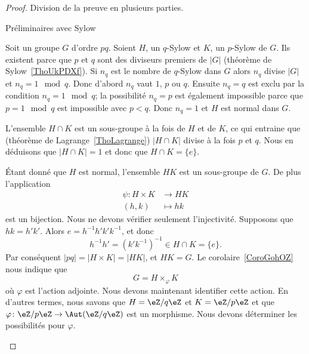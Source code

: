 \begin{proof}
    Division de la preuve en plusieurs parties.
    \begin{subproof}
    \item[Préliminaires avec Sylow]

        Soit un groupe \( G\) d'ordre \( pq\). Soient \( H\), un \( q\)-Sylow et \( K\), un \( p\)-Sylow de \( G\). Ils existent parce que \( p\) et \( q\) sont des diviseurs premiers de \( | G |\) (théorème de Sylow~\ref{ThoUkPDXf}). Si \( n_q\) est le nombre de \( q\)-Sylow dans \( G\) alors \( n_q\) divise \( | G |\) et \( n_q=1\mod q\). Donc d'abord \( n_q\) vaut \( 1\), \( p\) ou \( q\). Ensuite \( n_q=q\) est exclu par la condition \( n_q=1\mod q\); la possibilité \( n_q=p\) est également impossible parce que \( p=1\mod q\) est impossible avec \( p<q\). Donc \( n_q=1\) et \( H\) est normal dans \( G\).

        L'ensemble \( H\cap K\) est un sous-groupe à la fois de \( H\) et de \( K\), ce qui entraine que (théorème de Lagrange~\ref{ThoLagrange}) \( | H\cap K |\) divise à la fois \( p\) et \( q\). Nous en déduisons que \( | H\cap K |=1\) et donc que \( H\cap K=\{ e \}\).

        Étant donné que \( H\) est normal, l'ensemble \( HK\) est un sous-groupe de \( G\). De plus l'application
        \begin{equation}
            \begin{aligned}
                \psi\colon H\times K&\to HK \\
                (h,k)&\mapsto hk
            \end{aligned}
        \end{equation}
        est un bijection. Nous ne devons vérifier seulement l'injectivité. Supposons que \( hk=h'k'\). Alors \( e=h^{-1}h'k'k^{-1}\), et donc
        \begin{equation}
            h^{-1} h'=(k'k^{-1})^{-1}\in H\cap K=\{ e \}.
        \end{equation}
        Par conséquent \( | pq |=| H\times K |=| HK |\), et \( HK=G\). Le corolaire~\ref{CoroGohOZ} nous indique que
        \begin{equation}    \label{EqGjQjFN}
            G=H\times_{\varphi}K
        \end{equation}
        où \( \varphi\) est l'action adjointe. Nous devons maintenant identifier cette action. En d'autres termes, nous savons que \( H=\eZ/q\eZ\) et \( K=\eZ/p\eZ\) et que \( \varphi\colon \eZ/p\eZ\to \Aut(\eZ/q\eZ)\) est un morphisme. Nous devons déterminer les possibilités pour \( \varphi\).


\end{subproof}
\end{proof}
